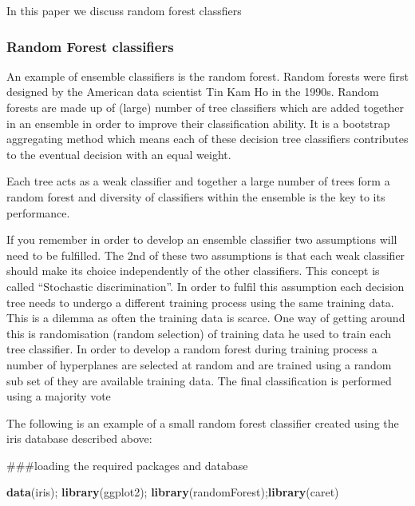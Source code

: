 \documentclass[
]{article}
\newenvironment{Shaded}{\begin{snugshade}}{\end{snugshade}}
\newcommand{\KeywordTok}[1]{\textcolor[rgb]{0.13,0.29,0.53}{\textbf{#1}}}
\newcommand{\NormalTok}[1]{#1}
\begin{document}
In this paper we discuss random forest classfiers

\hypertarget{random-forest-classifiers}{%
\subsubsection{Random Forest
classifiers}\label{random-forest-classifiers}}

An example of ensemble classifiers is the random forest. Random forests
were first designed by the American data scientist Tin Kam Ho in the
1990s. Random forests are made up of (large) number of tree classifiers
which are added together in an ensemble in order to improve their
classification ability. It is a bootstrap aggregating method which means
each of these decision tree classifiers contributes to the eventual
decision with an equal weight.

Each tree acts as a weak classifier and together a large number of trees
form a random forest and diversity of classifiers within the ensemble is
the key to its performance.

If you remember in order to develop an ensemble classifier two
assumptions will need to be fulfilled. The 2nd of these two assumptions
is that each weak classifier should make its choice independently of the
other classifiers. This concept is called ``Stochastic discrimination''.
In order to fulfil this assumption each decision tree needs to undergo a
different training process using the same training data. This is a
dilemma as often the training data is scarce. One way of getting around
this is randomisation (random selection) of training data he used to
train each tree classifier. In order to develop a random forest during
training process a number of hyperplanes are selected at random and are
trained using a random sub set of they are available training data. The
final classification is performed using a majority vote

The following is an example of a small random forest classifier created
using the iris database described above:

\#\#\#loading the required packages and database

\begin{Shaded}
\begin{Highlighting}[]
\KeywordTok{data}\NormalTok{(iris); }\KeywordTok{library}\NormalTok{(ggplot2); }\KeywordTok{library}\NormalTok{(randomForest);}\KeywordTok{library}\NormalTok{(caret)}
\end{Highlighting}
\end{Shaded}
\end{document}
